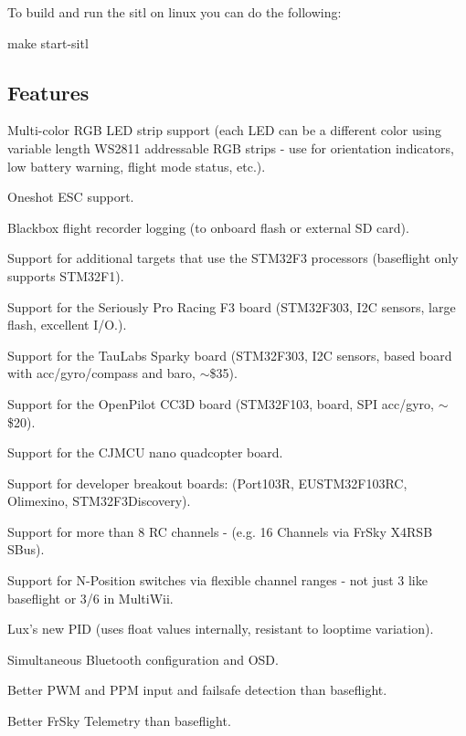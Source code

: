 To build and run the sitl on linux you can do the following\+: \begin{DoxyVerb}make start-sitl
\end{DoxyVerb}


\subsection*{Features}


\begin{DoxyItemize}
\item Multi-\/color R\+G\+B L\+E\+D strip support (each L\+E\+D can be a different color using variable length W\+S2811 addressable R\+G\+B strips -\/ use for orientation indicators, low battery warning, flight mode status, etc.).
\item Oneshot E\+S\+C support.
\item Blackbox flight recorder logging (to onboard flash or external S\+D card).
\item Support for additional targets that use the S\+T\+M32\+F3 processors (baseflight only supports S\+T\+M32\+F1).
\item Support for the Seriously Pro Racing F3 board (S\+T\+M32\+F303, I2\+C sensors, large flash, excellent I/\+O.).
\item Support for the Tau\+Labs Sparky board (S\+T\+M32\+F303, I2\+C sensors, based board with acc/gyro/compass and baro, $\sim$\$35).
\item Support for the Open\+Pilot C\+C3\+D board (S\+T\+M32\+F103, board, S\+P\+I acc/gyro, $\sim$\$20).
\item Support for the C\+J\+M\+C\+U nano quadcopter board.
\item Support for developer breakout boards\+: (Port103\+R, E\+U\+S\+T\+M32\+F103\+R\+C, Olimexino, S\+T\+M32\+F3\+Discovery).
\item Support for more than 8 R\+C channels -\/ (e.\+g. 16 Channels via Fr\+Sky X4\+R\+S\+B S\+Bus).
\item Support for N-\/\+Position switches via flexible channel ranges -\/ not just 3 like baseflight or 3/6 in Multi\+Wii.
\item Lux's new P\+I\+D (uses float values internally, resistant to looptime variation).
\item Simultaneous Bluetooth configuration and O\+S\+D.
\item Better P\+W\+M and P\+P\+M input and failsafe detection than baseflight.
\item Better Fr\+Sky Telemetry than baseflight.

\end{DoxyItemize}
